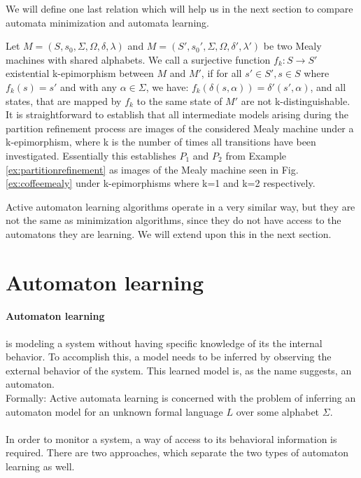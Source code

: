 We will define one last relation which will help us in the next section to compare automata minimization and automata learning.

Let  $M=(S,s_{0},\Sigma,\Omega,\delta,\lambda)$ and $M=(S',s_{0}',\Sigma,\Omega,\delta',\lambda')$ be two Mealy machines with shared alphabets. We call a surjective function $f_k: S \to S'$ existential k-epimorphism between $M$ and $M'$, if for all $s'\in S', s\in S$ where $f_k(s) = s'$ and with any $\alpha\in\Sigma$, we have: $f_k(\delta(s,\alpha)) = \delta'(s',\alpha)$, and all states, that are mapped by $f_k$ to the same state of $M'$ are not k-distinguishable. It is straightforward to establish that all intermediate models arising during the partition refinement process are images of the considered Mealy machine under a k-epimorphism, where k is the number of times all transitions have been investigated.\cite{Steffen2011} Essentially this establishes $P_1$ and $P_2$ from Example \ref*{ex:partitionrefinement} as images of the Mealy machine seen in Fig. \ref{ex:coffeemealy} under k-epimorphisms where k=1 and k=2 respectively.

Active automaton learning algorithms operate in a very similar way, but they are not the same as minimization algorithms, since they do not have access to the automatons they are learning. We will extend upon this in the next section.



\section{Automaton learning}



\paragraph{Automaton learning}  is modeling a system without having specific knowledge of its the internal behavior. To accomplish this, a model needs to be inferred by observing the external behavior of the system. This learned model is, as the name suggests, an automaton. 
\\Formally: Active  automata  learning is  concerned  with  the  problem  of  inferring  an automaton model for an unknown formal language $L$ over some alphabet $\Sigma$\cite{Howar2018}.
\\\\In order to monitor a system, a way of access to its behavioral information is required. There are two approaches, which separate the two types of automaton learning as well.

